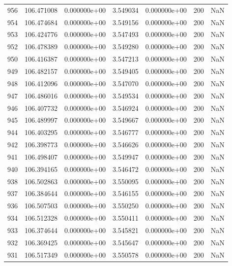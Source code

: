 \begin{tabular}{rrrrrrr}
 956 & 106.471008 &  0.000000e+00 &  3.549034 &  0.000000e+00 &         200 & NaN \\
 954 & 106.474684 &  0.000000e+00 &  3.549156 &  0.000000e+00 &         200 & NaN \\
 953 & 106.424776 &  0.000000e+00 &  3.547493 &  0.000000e+00 &         200 & NaN \\
 952 & 106.478389 &  0.000000e+00 &  3.549280 &  0.000000e+00 &         200 & NaN \\
 950 & 106.416387 &  0.000000e+00 &  3.547213 &  0.000000e+00 &         200 & NaN \\
 949 & 106.482157 &  0.000000e+00 &  3.549405 &  0.000000e+00 &         200 & NaN \\
 948 & 106.412096 &  0.000000e+00 &  3.547070 &  0.000000e+00 &         200 & NaN \\
 947 & 106.486016 &  0.000000e+00 &  3.549534 &  0.000000e+00 &         200 & NaN \\
 946 & 106.407732 &  0.000000e+00 &  3.546924 &  0.000000e+00 &         200 & NaN \\
 945 & 106.489997 &  0.000000e+00 &  3.549667 &  0.000000e+00 &         200 & NaN \\
 944 & 106.403295 &  0.000000e+00 &  3.546777 &  0.000000e+00 &         200 & NaN \\
 942 & 106.398773 &  0.000000e+00 &  3.546626 &  0.000000e+00 &         200 & NaN \\
 941 & 106.498407 &  0.000000e+00 &  3.549947 &  0.000000e+00 &         200 & NaN \\
 940 & 106.394165 &  0.000000e+00 &  3.546472 &  0.000000e+00 &         200 & NaN \\
 938 & 106.502863 &  0.000000e+00 &  3.550095 &  0.000000e+00 &         200 & NaN \\
 937 & 106.384644 &  0.000000e+00 &  3.546155 &  0.000000e+00 &         200 & NaN \\
 936 & 106.507503 &  0.000000e+00 &  3.550250 &  0.000000e+00 &         200 & NaN \\
 934 & 106.512328 &  0.000000e+00 &  3.550411 &  0.000000e+00 &         200 & NaN \\
 933 & 106.374644 &  0.000000e+00 &  3.545821 &  0.000000e+00 &         200 & NaN \\
 932 & 106.369425 &  0.000000e+00 &  3.545647 &  0.000000e+00 &         200 & NaN \\
 931 & 106.517349 &  0.000000e+00 &  3.550578 &  0.000000e+00 &         200 & NaN \\

\end{tabular}
